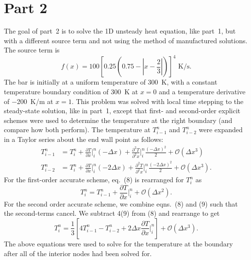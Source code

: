 \documentclass[11pt, letterpaper]{article}
\newcommand{\p}{\partial}
\begin{document}

\section{Part 2}

The goal of part~2 is to solve the 1D unsteady heat equation, like part~1, but
with a different source term and not using the method of manufactured solutions.
The source term is
%
\begin{equation}
	\label{p2_fx}
	f(x) = 100 \left[ 0.25 \left( 0.75 - \left| x - \frac{2}{3} \right| \right) \right] ^ 4 
	\mbox{ K/s}.
\end{equation}
%
The bar is initially at a uniform temperature of \SI{300}{K}, with a constant temperature
boundary condition of \SI{300}{K} at $x=0$ and a temperature derivative of \SI{-200}{K/m}
at $x=1$.  This problem was solved with local time stepping to the steady-state solution,
like in part~1, except that first- and second-order explicit schemes were used
to determine the temperature at the right boundary (and compare how both
perform).  The temperature at $T_{i-1}^n$ and
$T_{i-2}^n$ were expanded in a Taylor series about the end wall point as follows:
%
\begin{align}	
	T_{i-1}^n &= T_i^n + \frac{\p T}{\p x}\bigg|_{i}^n (-\Delta x) + 
				\frac{\p^2 T}{\p^2 x}\bigg|_{i}^n \frac{(-\Delta x)^2}{2} + 
				\mathcal{O}(\Delta x^3) \label{eqn:O1} \\
	T_{i-2}^n &= T_i^n + \frac{\p T}{\p x}\bigg|_{i}^n (-2\Delta x) + 
				\frac{\p^2 T}{\p^2 x}\bigg|_{i}^n \frac{(-2\Delta x)^2}{2} +
				\mathcal{O}(\Delta x^3) \label{eqn:O2}.
\end{align}
%
For the first-order accurate scheme, eq.~(8) is rearranged for $T_i^n$ as
%
\begin{equation}
	T_{i}^n = T_{i-1}^n + \frac{\p T}{\p x}\bigg|_{i}^n + \mathcal{O}(\Delta x^2).
\end{equation}
%
For the second order accurate scheme, we combine eqns.~(8) and (9) such that the
second-terms cancel.  We subtract 4(9) from (8) and rearrange to get
%
\begin{equation}
	T_i^n = \frac{1}{3} \left[ 4 T_{i-1}^n - T_{i-2}^n + 
	2\Delta x \frac{\p T}{\p x}\bigg|_{i}^n \right] + \mathcal{O}(\Delta x^3).
\end{equation}
%
The above equations were used to solve for the temperature at the boundary after all of
the interior nodes had been solved for.
\end{document}
